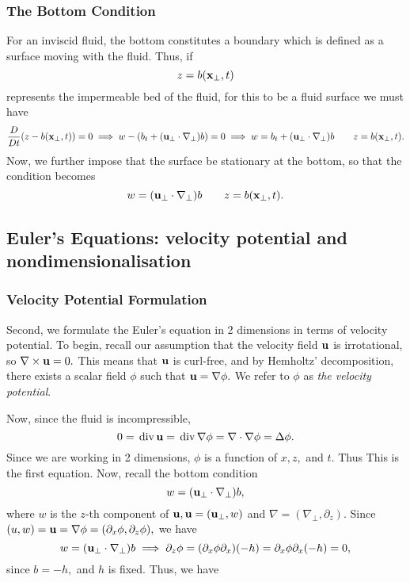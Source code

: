 \documentclass[10pt,reqno,oneside,a4paper]{article}
\begin{document}
\subsubsection*{The Bottom Condition}
For an inviscid fluid, the bottom constitutes a boundary which is defined as a surface moving with the fluid. Thus, if 
\[ 
z = b({\bf x}_\perp, t)
\]
represents the impermeable bed of the fluid, for this to be a fluid surface we must have 
\[ 
\frac{D}{Dt}(z -  b({\bf x}_{\perp}, t)) = 0 \implies w -( b_t + ({\bf u}_{\perp}\cdot \nabla_{\perp})b )= 0 \implies w =b_t + ({\bf u}_{\perp}\cdot \nabla_{\perp})b \qquad z = b({\bf x}_{\perp}, t).
\]
Now, we further impose that the surface be stationary at the bottom, so that the condition becomes
\[ 
w = ({\bf u}_{\perp}\cdot \nabla_{\perp})b \qquad z = b({\bf x}_{\perp}, t).
\]

\subsection{Euler's Equations: velocity potential and nondimensionalisation}

\subsubsection{Velocity Potential Formulation}
Second, we formulate the Euler's equation in 2 dimensions in terms of velocity potential. To begin, recall our assumption that the velocity field ${\bf u}$ is irrotational, so $\nabla \times {\bf u} = 0.$ This means that ${\bf u}$ is curl-free, and by Hemholtz' decomposition, there exists a scalar field $\phi$ such that ${\bf u} = \nabla \phi.$ We refer to $\phi$ as \emph{the velocity potential}. 

Now, since the fluid is incompressible, 
\[ 
0 = \,\mathrm{div}\, {\bf u} = \,\mathrm{div}\, \nabla \phi = \nabla \cdot \nabla \phi = \Delta \phi. 
\]
Since we are working in 2 dimensions, $\phi$ is a function of $x,z,$ and $t.$ Thus
This is the first equation. Now, recall the bottom condition
\[ 
w = ({\bf u}_{\perp} \cdot \nabla_{\perp})b,
\]
where $w$ is the $z$-th component of ${\bf u}, {\bf u} = ({\bf u}_{\perp}, w)$ and $\nabla = (\nabla_{\perp}, \partial_z).$ Since $(u,w) = {\bf u} = \nabla \phi = (\partial_x \phi, \partial_z \phi),$ we have
\[ 
w = ({\bf u}_{\perp} \cdot \nabla_{\perp})b \implies \partial_z \phi = (\partial_x \phi  \partial_x)(-h) = \partial_x \phi \partial_x (-h) = 0,
\]
since $b = -h,$ and $h$ is fixed. Thus, we have 
\end{document}
